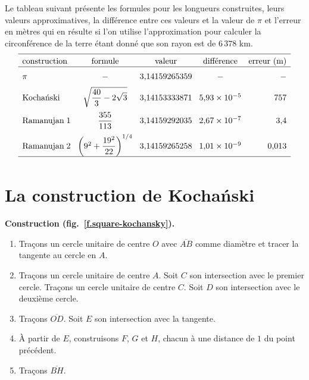 Le tableau suivant présente les formules pour les longueurs construites, leurs valeurs approximatives, la différence entre ces valeurs et la valeur de $\pi$ et l'erreur en mètres qui en résulte si l'on utilise l'approximation pour calculer la circonférence de la terre étant donné que son rayon est de $6\,378$ km.
\[
\begin{array}{l@{\hspace{3mm}}c@{\hspace{3mm}}c@{\hspace{3mm}}c@{\hspace{3mm}}r}
\hline\noalign{\smallskip}
\textrm{construction} & \textrm{formule} &\textrm{valeur} & \textrm{différence} & \textrm{erreur (m)}\\\hline\noalign{\medskip}
\pi & -& \mbox{3,14159265359} & - & -\\\noalign{\medskip}
\textrm{Kocha\'{n}ski} & \sqrt{\displaystyle\frac{40}{3}-2\sqrt{3}}&
  \mbox{3,14153333871} & \mbox{5,93} \times 10^{-5} & 757\\\noalign{\medskip}
\textrm{Ramanujan}\; 1 & \displaystyle\frac{355}{113} &
  \mbox{3,14159292035} &\mbox{2,67}  \times 10^{-7}&\mbox{3,4}\\\noalign{\medskip}
\textrm{Ramanujan}\; 2 &\left(9^2+\displaystyle\frac{19^2}{22}\right)^{1/4}&
  \mbox{3,14159265258} & \mbox{1,01} \times 10^{-9}& \mbox{0,013}\\
\hline\noalign{\smallskip}
\end{array}
\]


\section{La construction de Kocha\'{n}ski }\label{s.square-kochanski}

\textbf{Construction (fig.~\ref{f.square-kochansky}).}
\begin{enumerate}
\item Traçons un cercle unitaire de centre  $O$ avec $\overline{AB}$ comme diamètre et tracer la tangente au cercle en $A$.
\item Traçons un cercle unitaire de centre  $A$. Soit $C$ son intersection avec le premier cercle. Traçons un cercle unitaire de centre  $C$. Soit $D$ son intersection avec le deuxième cercle. 
\item Traçons $\overline{OD}$. Soit $E$ son intersection avec la tangente.
\item \`A partir de $E$, construisons  $F$, $G$ et $H$, chacun à une distance de $1$ du point précédent.
\item Traçons $\overline{BH}$.
\end{enumerate}

